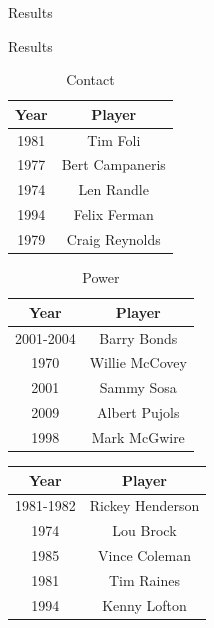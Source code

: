 \documentclass{beamer}
\theoremstyle{definition}
\begin{document}
\begin{frame}{Results}
\begin{figure}
\endminipage\hfill
\end{figure}
\end{frame}

\begin{frame}{Results}
\begin{multicols}{2}
\small
    \begin{table}[]
        \centering
        \begin{tabular}{cc}
            Year & Player \\
            \hline
1981 & Tim Foli \\
1977 & Bert Campaneris \\
1974 & Len Randle  \\
1994 & Felix Ferman \\
1979 & Craig Reynolds \\
        \end{tabular}
        \caption{Contact}
        \label{tab:contact}
    \end{table}
    \begin{table}[]
        \centering
        \begin{tabular}{cc}
            Year & Player \\
            \hline
2001-2004 & Barry Bonds \\
1970 & Willie McCovey \\
2001 & Sammy Sosa \\
2009 & Albert Pujols \\
1998 & Mark McGwire \\
        \end{tabular}
        \caption{Power}
        \label{tab:power}
    \end{table}
    \columnbreak
    \begin{table}[]
        \centering
        \begin{tabular}{cc}
            Year & Player \\
            \hline
1981-1982 & Rickey Henderson \\
1974 & Lou Brock \\
1985 & Vince Coleman \\
1981 &  Tim Raines \\
1994 & Kenny Lofton \\
        \end{tabular}

\end{table}
\end{multicols}
\end{frame}
\end{document}
